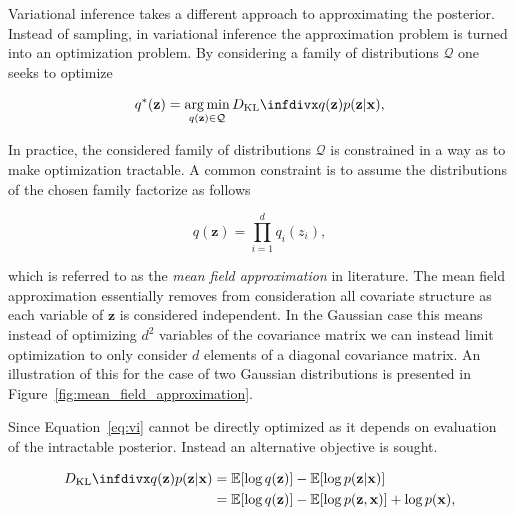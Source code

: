 Variational inference takes a different approach to approximating the posterior. Instead of sampling, in variational inference the approximation problem is turned into an optimization problem. By considering a family of distributions $\mathcal{Q}$ one seeks to optimize

\begin{equation}
q^{*}(\mathbf{z}) = \argmin_{q(\mathbf{z}) \in \mathcal{Q}} \dkl{q(\mathbf{z})}{p(\mathbf{z} \vert \mathbf{x})},
\label{eq:vi}
\end{equation}


In practice, the considered family of distributions $\mathcal{Q}$ is constrained in a way as to make optimization tractable. A common constraint is to assume the distributions of the chosen family factorize as follows

$$q(\mathbf{z}) = \prod_{i=1}^{d} q_{i}(z_{i}),$$

which is referred to as the \textit{mean field approximation} in literature. The mean field approximation essentially removes from consideration all covariate structure as each variable of $\mathbf{z}$ is considered independent. In the Gaussian case this means instead of optimizing $d^2$ variables of the covariance matrix we can instead limit optimization to only consider $d$ elements of a diagonal covariance matrix. An illustration of this for the case of two Gaussian distributions is presented in Figure~\ref{fig:mean_field_approximation}.

Since Equation~\ref{eq:vi} cannot be directly optimized as it depends on evaluation of the intractable posterior. Instead an alternative objective is sought.

\begin{equation}
\begin{aligned}
\dkl{q(\mathbf{z})}{p(\mathbf{z} \vert \mathbf{x})} &= \mathbb{E}[\log q(\mathbf{z})] - \mathbb{E}[\log p(\mathbf{z} \vert \mathbf{x})] \\
                                                    &= \mathbb{E}[\log q(\mathbf{z})] - \mathbb{E}[\log p(\mathbf{z}, \mathbf{x})] + \log p(\mathbf{x}),
\end{aligned}
\end{equation}

